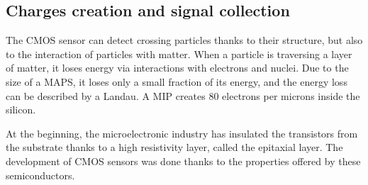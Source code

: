   


    \subsection{Charges creation and signal collection}   

    The \gls{CMOS} sensor can detect crossing particles thanks to their structure, but also to the interaction of particles with matter.
    When a particle is traversing a layer of matter, it loses energy via interactions with electrons and nuclei.
    Due to the size of a \gls{MAPS}, it loses only a small fraction of its energy, and the energy loss can be described by a Landau.
    A \gls{MIP} creates 80 electrons per microns inside the silicon.

    At the beginning, the microelectronic industry has insulated the transistors from the substrate thanks to a high resistivity layer, called the epitaxial layer.
    The development of \gls{CMOS} sensors was done thanks to the properties offered by these semiconductors.
    
    
